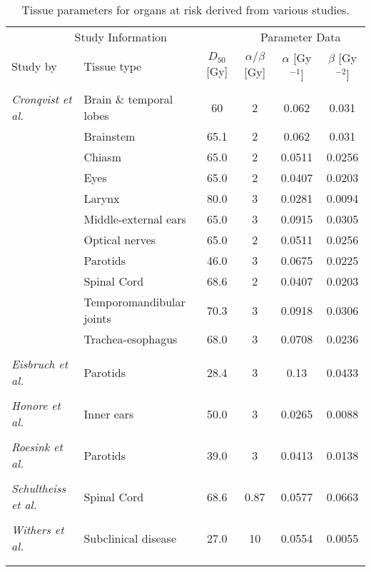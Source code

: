 \begin{table}[htb]
\centering
\footnotesize
\begin{tabular}{llcccc}
\toprule
\multicolumn{3}{c}{Study Information} & \multicolumn{3}{c}{Parameter Data} \\
\cmidrule(r){1-3} \cmidrule(r){4-6}
Study by & Tissue type & $D_{50}$ [Gy]& $\alpha/\beta$ [Gy] & $\alpha$ [Gy$^{-1}$] & $\beta$ [Gy$^{-2}$]\\
\midrule\\
\textit{Cronqvist et al.}\cite{CronqvistThesis}& Brain \& temporal lobes&60 & 2 & 0.062 & 0.031\\
& Brainstem & 65.1 & 2 & 0.062 & 0.031\\
& Chiasm & 65.0 & 2 & 0.0511 & 0.0256\\
& Eyes & 65.0 & 2 & 0.0407 & 0.0203\\
& Larynx & 80.0 & 3 & 0.0281 & 0.0094\\
& Middle-external ears & 65.0 & 3 & 0.0915 & 0.0305\\
& Optical nerves & 65.0 & 2 & 0.0511 & 0.0256\\
& Parotids & 46.0 & 3 & 0.0675 & 0.0225\\
& Spinal Cord & 68.6 & 2 & 0.0407 & 0.0203\\
& Temporomandibular joints & 70.3 & 3 & 0.0918 & 0.0306\\
& Trachea-esophagus & 68.0 & 3 & 0.0708 & 0.0236\\\\
\textit{Eisbruch et al.}\cite{pmid10524409}& Parotids & 28.4 & 3 & 0.13 & 0.0433\\\\
\textit{Honore et al.}\cite{pmid12413669}& Inner ears & 50.0 & 3 & 0.0265 & 0.0088\\\\
\textit{Roesink et al.}\cite{pmid11704314}& Parotids & 39.0 &3 & 0.0413 & 0.0138\\\\
\textit{Schultheiss et al.}\cite{pmid18243570}& Spinal Cord & 68.6 &0.87 & 0.0577 & 0.0663\\\\
\textit{Withers et al.}\cite{pmid7836089}& Subclinical disease & 27.0 & 10 & 0.0554 & 0.0055\\\\
\bottomrule\\
\end{tabular}
\caption{Tissue parameters for organs at risk derived from various studies. }
\label{tab:oartissueparameter}
\end{table}
